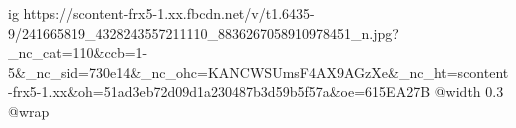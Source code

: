  
 
 
 
 

\ifcmt
  ig https://scontent-frx5-1.xx.fbcdn.net/v/t1.6435-9/241665819_4328243557211110_8836267058910978451_n.jpg?_nc_cat=110&ccb=1-5&_nc_sid=730e14&_nc_ohc=KANCWSUmsF4AX9AGzXe&_nc_ht=scontent-frx5-1.xx&oh=51ad3eb72d09d1a230487b3d59b5f57a&oe=615EA27B
  @width 0.3
  @wrap \parpic[r]
\fi

